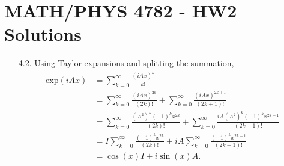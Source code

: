 \documentclass[a4paper,12pt]{article}
\begin{document}
	
\section*{MATH/PHYS 4782 - HW2 Solutions}

\begin{enumerate}

	\item[4.2.] Using Taylor expansions and splitting the summation,
        \begin{align*}
            \mbox{exp}(iAx) &= \sum_{k = 0}^{\infty} \frac{(iAx)^k}{k!} \\
            &= \sum_{k = 0}^{\infty} \frac{(iAx)^{2k}}{(2k)!} + \sum_{k = 0}^{\infty} \frac{(iAx)^{2k + 1}}{(2k + 1)!} \\
            &= \sum_{k = 0}^{\infty} \frac{(A^2)^k (-1)^k x^{2k}}{(2k)!} + \sum_{k = 0}^{\infty} \frac{iA(A^2)^k (-1)^k x^{2k + 1}}{(2k + 1)!} \\
            &= I \sum_{k = 0}^{\infty} \frac{(-1)^k x^{2k}}{(2k)!} + iA \sum_{k = 0}^{\infty} \frac{(-1)^k x^{2k + 1}}{(2k + 1)!} \\
            &= \cos(x) I + i\sin(x)A.
        \end{align*}


\end{enumerate}
\end{document}

